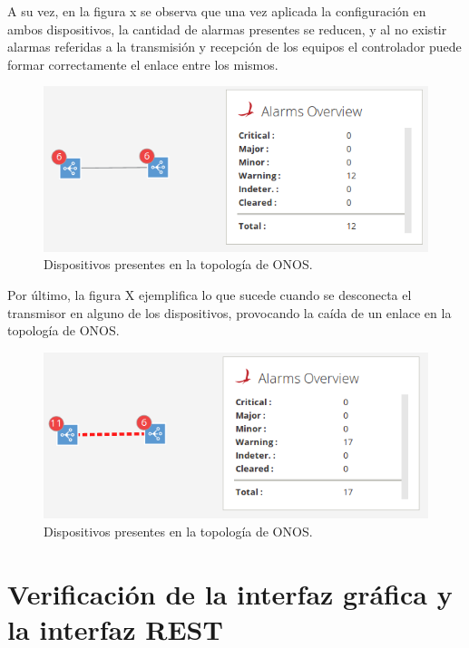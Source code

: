   A su vez, en la figura x se observa que una vez aplicada la configuración en ambos dispositivos, la cantidad de alarmas presentes se reducen, y al no existir alarmas referidas a la transmisión y recepción de los equipos el controlador puede formar correctamente el enlace entre los mismos. 

  \begin{figure}[H]
	\centering
	\includegraphics[scale=0.5]{Figures/test5_2.png}
	\caption{Dispositivos presentes en la topología de ONOS.}
	\label{fig:test4_consulta}
  \end{figure}

  Por último, la figura X ejemplifica lo que sucede cuando se desconecta el transmisor en alguno de los dispositivos, provocando la caída de un enlace en la topología de ONOS.

  \begin{figure}[H]
	\centering
	\includegraphics[scale=0.5]{Figures/test5_3.png}
	\caption{Dispositivos presentes en la topología de ONOS.}
	\label{fig:test4_consulta}
  \end{figure}




\section{Verificación de la interfaz gráfica y la interfaz REST}

